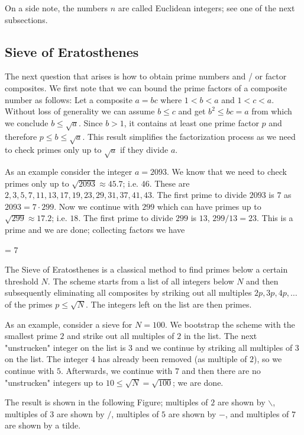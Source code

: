 On a side note, the numbers $n$ are called Euclidean integers; see one of the next subsections.

\subsection{Sieve of Eratosthenes}

The next question that arises is how to obtain prime numbers and / or factor composites. We first note that we can bound the prime factors of a composite number as follows: Let a composite $a = bc$ where $1 < b < a$ and $1 < c < a$. Without loss of generality we can assume $b \leq c$ and get $b^2 \leq bc = a$ from which we conclude $b \leq \sqrt{a}$. Since $b > 1$, it contains at least one prime factor $p$ and therefore $p \leq b \leq \sqrt{a}$. This result simplifies the factorization process as we need to check primes only up to $\sqrt{a}$ if they divide $a$.

As an example consider the integer $a = 2093$. We know that we need to check primes only up to $\sqrt{2093} \approx 45.7$; i.e. $46$. These are $2, 3, 5, 7, 11, 13, 17, 19, 23, 29, 31, 37, 41, 43$. The first prime to divide $2093$ is $7$ as $2093 = 7 \cdot 299$. Now we continue with $299$ which can have primes up to $\sqrt{299} \approx 17.2$; i.e. $18$. The first prime to divide $299$ is $13$, $299 / 13 = 23$. This is a prime and we are done; collecting factors we have

 = 7  
\eee

The Sieve of Eratosthenes is a classical method to find primes below a certain threshold $N$. The scheme starts from a list of all integers below $N$ and then subsequently eliminating all composites by striking out all multiples $2p, 3p, 4p, \ldots$ of the primes $p \leq \sqrt{N}$. The integers left on the list are then primes.

As an example, consider a sieve for $N = 100$. We bootstrap the scheme with the smallest prime $2$ and strike out all multiples of $2$ in the list. The next "unstrucken" integer on the list is $3$ and we continue by striking all multiples of $3$ on the list. The integer $4$ has already been removed (as multiple of $2$), so we continue with $5$. Afterwards, we continue with $7$ and then there are no "unstrucken" integers up to $10 \leq \sqrt{N} = \sqrt{100}$; we are done.

The result is shown in the following Figure; multiples of $2$ are shown by $\backslash$, multiples of $3$ are shown by $/$, multiples of $5$ are shown by $-$, and multiples of $7$ are shown by a tilde.

